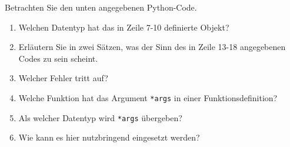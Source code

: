 Betrachten Sie den unten angegebenen Python-Code.
\begin{enumerate}
	\item Welchen Datentyp hat das in Zeile 7-10 definierte Objekt?
	\item Erläutern Sie in zwei Sätzen, was der Sinn des in Zeile 13-18 angegebenen Codes zu sein scheint.
	\item Welcher Fehler tritt auf?
	\item Welche Funktion hat das Argument \verb|*args| in einer Funktionsdefinition?
	\item Als welcher Datentyp wird \verb|*args| übergeben?
	\item Wie kann es hier nutzbringend eingesetzt werden?
\end{enumerate}

